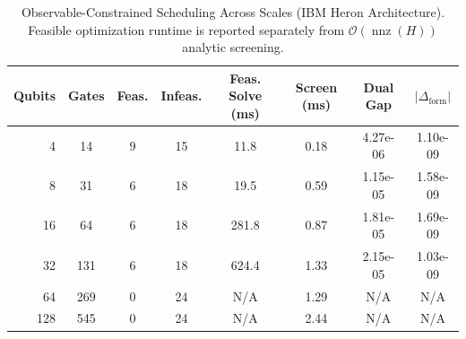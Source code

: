 \begin{table}[t]
\centering
\caption{Observable-Constrained Scheduling Across Scales (IBM Heron Architecture). Feasible optimization runtime is reported separately from $\mathcal{O}(\operatorname{nnz}(H))$ analytic screening.}
\label{tab:observables}
\begin{tabular}{rccccccc}
\hline
Qubits & Gates & Feas. & Infeas. & Feas. Solve (ms) & Screen (ms) & Dual Gap & $|\Delta_{\mathrm{form}}|$\\ \hline
4 & 14 & 9 & 15 & 11.8 & 0.18 & 4.27e-06 & 1.10e-09 \\
8 & 31 & 6 & 18 & 19.5 & 0.59 & 1.15e-05 & 1.58e-09 \\
16 & 64 & 6 & 18 & 281.8 & 0.87 & 1.81e-05 & 1.69e-09 \\
32 & 131 & 6 & 18 & 624.4 & 1.33 & 2.15e-05 & 1.03e-09 \\
64 & 269 & 0 & 24 & N/A & 1.29 & N/A & N/A \\
128 & 545 & 0 & 24 & N/A & 2.44 & N/A & N/A \\
\hline
\end{tabular}
\end{table}
